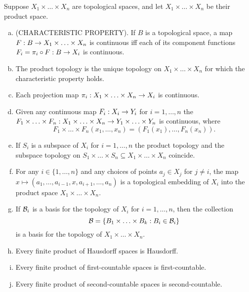 \documentclass[11pt,a4paper]{article}
\begin{document}
\begin{prop}\label{prop:product_topology}
Suppose $X_1\times\ldots\times X_n$ are topological spaces, and let $X_1\times\ldots\times X_n$ be their product space.
\begin{enumerate}[(a)]
    \item (CHARACTERISTIC PROPERTY). If $B$ is a topological space, a map $F:B\rightarrow X_1\times\ldots\times X_n$ is continuous iff each of its component functions $F_i = \pi_i\circ F:B\rightarrow X_i$ is continuous.
    \item The product topology is the unique topology on $X_1\times\ldots\times X_n$ for which the characteristic property holds.
    \item Each projection map $\pi_i:X_1\times\ldots\times X_n\rightarrow X_i$ is continuous.
    \item Given any continuous map $F_i:X_i\rightarrow Y_i$ for $i=1,\ldots,n$ the  $F_1\times \ldots\times F_n:X_1\times\ldots\times X_n\rightarrow Y_1\times\ldots\times Y_n$ is continuous, where 
    \begin{equation*}
    F_1\times \ldots\times F_n(x_1,\ldots,x_n) = (F_1(x_1),\ldots,F_n(x_n)).
    \end{equation*}
    \item If $S_i$ is a subspace of $X_i$ for $i=1,\ldots,n$ the product topology and the subspace topology on $S_1\times\ldots\times S_n\subseteq X_1\times\ldots\times X_n$ coincide.
    \item For any $i\in \{1,\ldots,n\}$ and any choices of points $a_j\in X_j$ for $j\neq i$, the map $x\mapsto (a_1,\ldots,a_{i-1},x,a_{i+1},\ldots,a_n)$ is a topological embedding of $X_i$ into the product space $X_1\times\ldots\times X_n$.
    \item If $\mathcal{B}_i$ is a basis for the topology of $X_i$ for $i = 1,\ldots,n$, then the collection $$\mathcal{B} = \{B_1\times \ldots\times B_k:B_i\in\mathcal{B}_i\}$$ is a basis for the topology of $X_1\times\ldots\times X_n$.
    \item Every finite product of Hausdorff spaces is Hausdorff.
    \item Every finite product of first-countable spaces is first-countable.
    \item Every finite product of second-countable spaces is second-countable.
\end{enumerate}
\end{prop}
\end{document}
